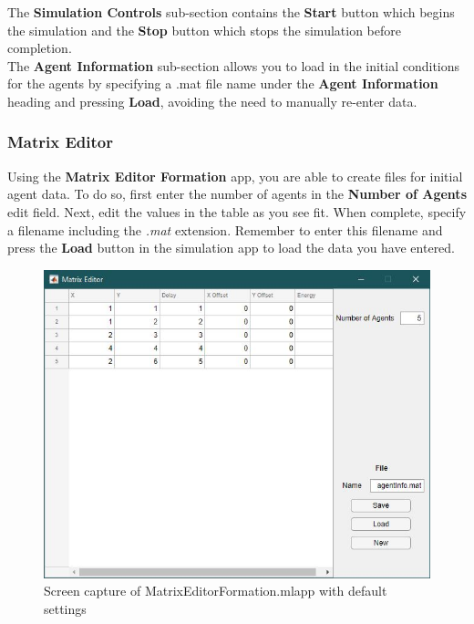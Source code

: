 \documentclass[../CourseManual.tex]{subfiles}
\begin{document}
The \textbf{Simulation Controls} sub-section contains the \textbf{Start} button which begins the simulation and the \textbf{Stop} button which stops the simulation before completion. \\

The \textbf{Agent Information} sub-section allows you to load in the initial conditions for the agents by specifying a .mat file name under the \textbf{Agent Information} heading and pressing \textbf{Load}, avoiding the need to manually re-enter data. \\

\subsubsection{Matrix Editor} \label{Matrix Editor: Formation}

Using the \textbf{Matrix Editor Formation} app, you are able to create files for initial agent data. To do so, first enter the number of agents in the \textbf{Number of Agents} edit field. Next, edit the values in the table as you see fit. When complete, specify a filename including the \textit{.mat} extension. Remember to enter this filename and press the \textbf{Load} button in the simulation app to load the data you have entered.

\begin{figure}[H]
    \centering
    \includegraphics[width=350pt]{media/MatrixEditorFormation.JPG}
    \caption{Screen capture of MatrixEditorFormation.mlapp with default settings}
    \label{fig: matrix editor formation}
\end{figure}
\end{document}
